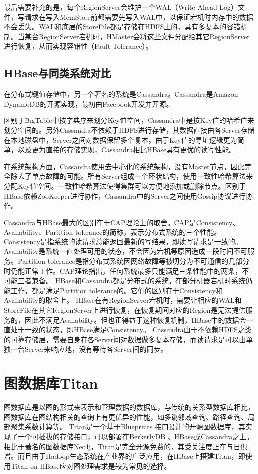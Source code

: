 最后需要补充的是，每个RegionServer会维护一个WAL（Write Ahead Log）文件，写请求在写入MemStore前都需要先写入WAL中，以保证宕机时内存中的数据不会丢失。WAL和底层的StoreFile都是存储在HDFS上的，具有多复本的容错机制。当某台RegionServer宕机时，HMaster会将这些文件分配给其它RegionServer进行恢复，从而实现容错性（Fault Tolerance）。

\subsection{HBase与同类系统对比}
在分布式键值存储中，另一个著名的系统是Cassandra\supercite{cassandra}。Cassandra是Amazon DynamoDB\supercite{DynamoDB}的开源实现，最初由Facebook开发并开源。

区别于BigTable中按字典序来划分Key值空间，Cassandra中是按Key值的哈希值来划分空间的。另外Cassandra不依赖于HDFS进行存储，其数据直接由各Server存储在本地磁盘中，Server之间对数据保留多个复本。由于Key值的寻址逻辑更为简单，以及更为直接的存储实现，Cassandra相比HBase具有更优的读写性能。

在系统架构方面，Cassandra使用去中心化的系统架构，没有Master节点，因此完全除去了单点故障的可能。所有Server组成一个环状结构，使用一致性哈希算法来分配Key值空间。一致性哈希算法使得集群可以方便地添加或删除节点。区别于HBase依赖ZooKeeper进行协作，Cassandra中的Server之间使用Gossip协议进行协作。

Cassandra与HBase最大的区别在于CAP\supercite{CAP}理论上的取舍。CAP是Consistency、Availability、Partition tolerance的简称，表示分布式系统的三个性能。Consistency是指系统的读请求总能返回最新的写结果，即读写请求是一致的。Availability是系统一直处理可用的状态，不会因为宕机等原因造成一段时间不可服务。Partition tolerance是指分布式系统因网络故障等被切分为不可通信的几部分时仍能正常工作。CAP理论指出，任何系统最多只能满足三条性能中的两条，不可能三者兼备。
HBase和Cassandra都是分布式的系统，在部分机器宕机时系统仍能工作，都是满足Partition tolerance的。它们的区别在于Consistency和Availability的取舍上。
HBase在有RegionServer宕机时，需要让相应的WAL和StoreFile在其它RegionServer上进行恢复，在恢复期间对应的Region是无法提供服务的，因此不满足Availability。但也正得益于这种恢复机制，HBase中的数据会一直处于一致的状态，即HBase满足Consistency。
Cassandra由于不依赖HDFS之类的可靠存储层，需要自身在各Server间对数据做多复本存储，而读请求是可以由单独一台Server来响应地，没有等待各Server间的同步。

\section{图数据库Titan}
图数据库是以图的形式来表示和管理数据的数据库\supercite{graph_models_survey}，与传统的关系型数据库相比，图数据库在图结构相关的查询上有更优异的性能，如多跳邻域查询、路径查询、局部聚集系数计算等。
Titan是一个基于Blueprints 接口设计的开源图数据库，其实现了一个可插拔的存储接口，可以部署在BerkerlyDB 、HBase或Cassandra之上。相比于著名的图数据库Neo4j，Titan是完全开源免费的，其受关注度正在与日俱增。而且由于Hadoop生态系统在产业界的广泛应用，在HBase上搭建Titan，即使用Titan on HBase应对图处理需求是较为常见的选择。

